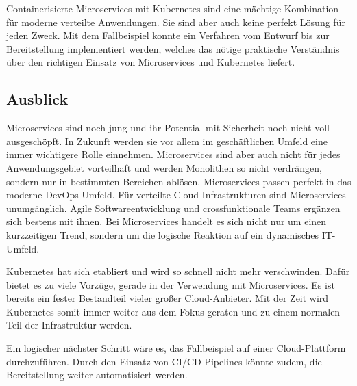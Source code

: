 Containerisierte Microservices mit Kubernetes sind eine mächtige Kombination für moderne verteilte Anwendungen. Sie sind aber auch keine perfekt Lösung für jeden Zweck. Mit dem Fallbeispiel konnte ein Verfahren vom Entwurf bis zur Bereitstellung implementiert werden, welches das nötige praktische Verständnis über den richtigen Einsatz von Microservices und Kubernetes liefert.

\subsection{Ausblick}

Microservices sind noch jung und ihr Potential mit Sicherheit noch nicht voll ausgeschöpft. In Zukunft werden sie vor allem im geschäftlichen Umfeld eine immer wichtigere Rolle einnehmen. Microservices sind aber auch nicht für jedes Anwendungsgebiet vorteilhaft und werden Monolithen so nicht verdrängen, sondern nur in bestimmten Bereichen ablösen. Microservices passen perfekt in das moderne DevOps-Umfeld. Für verteilte Cloud-Infrastrukturen sind Microservices unumgänglich. Agile Softwareentwicklung und crossfunktionale Teams ergänzen sich bestens mit ihnen. Bei Microservices handelt es sich nicht nur um einen kurzzeitigen Trend, sondern um die logische Reaktion auf ein dynamisches IT-Umfeld.

Kubernetes hat sich etabliert und wird so schnell nicht mehr verschwinden. Dafür bietet es zu viele Vorzüge, gerade in der Verwendung mit Microservices. Es ist bereits ein fester Bestandteil vieler großer Cloud-Anbieter. Mit der Zeit wird Kubernetes somit immer weiter aus dem Fokus geraten und zu einem normalen Teil der Infrastruktur werden.

Ein logischer nächster Schritt wäre es, das Fallbeispiel auf einer Cloud-Plattform durchzuführen. Durch den Einsatz von CI/CD-Pipelines könnte zudem, die Bereitstellung weiter automatisiert werden.
